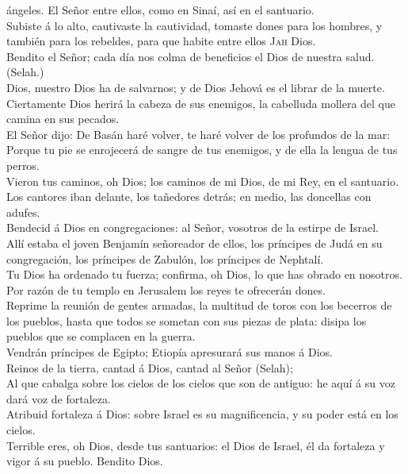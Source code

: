 ángeles. El Señor entre ellos, como en Sinaí, así en el santuario.\\
 Subiste á lo alto, cautivaste la cautividad, tomaste
dones para los hombres, y también para los rebeldes, para que habite
entre ellos \textsc{Jah} Dios.\\
 Bendito el Señor; cada día nos colma de beneficios el
Dios de nuestra salud. (Selah.)\\
 Dios, nuestro Dios ha de salvarnos; y de Dios Jehová es
el librar de la muerte.\\
 Ciertamente Dios herirá la cabeza de sus enemigos, la
cabelluda mollera del que camina en sus pecados.\\
 El Señor dijo: De Basán haré volver, te haré volver de
los profundos de la mar:\\
 Porque tu pie se enrojecerá de sangre de tus enemigos, y
de ella la lengua de tus perros.\\
 Vieron tus caminos, oh Dios; los caminos de mi Dios, de
mi Rey, en el santuario.\\
 Los cantores iban delante, los tañedores detrás; en
medio, las doncellas con adufes.\\
 Bendecid á Dios en congregaciones: al Señor, vosotros de
la estirpe de Israel.\\
 Allí estaba el joven Benjamín señoreador de ellos, los
príncipes de Judá en su congregación, los príncipes de Zabulón, los
príncipes de Nephtalí.\\
 Tu Dios ha ordenado tu fuerza; confirma, oh Dios, lo que
has obrado en nosotros.\\
 Por razón de tu templo en Jerusalem los reyes te
ofrecerán dones.\\
 Reprime la reunión de gentes armadas, la multitud de
toros con los becerros de los pueblos, hasta que todos se sometan con
sus piezas de plata: disipa los pueblos que se complacen en la guerra.\\
 Vendrán príncipes de Egipto; Etiopía apresurará sus
manos á Dios.\\
 Reinos de la tierra, cantad á Dios, cantad al Señor
(Selah);\\
 Al que cabalga sobre los cielos de los cielos que son de
antiguo: he aquí á su voz dará voz de fortaleza.\\
 Atribuid fortaleza á Dios: sobre Israel es su
magnificencia, y su poder está en los cielos.\\
 Terrible eres, oh Dios, desde tus santuarios: el Dios de
Israel, él da fortaleza y vigor á su pueblo. Bendito Dios.

